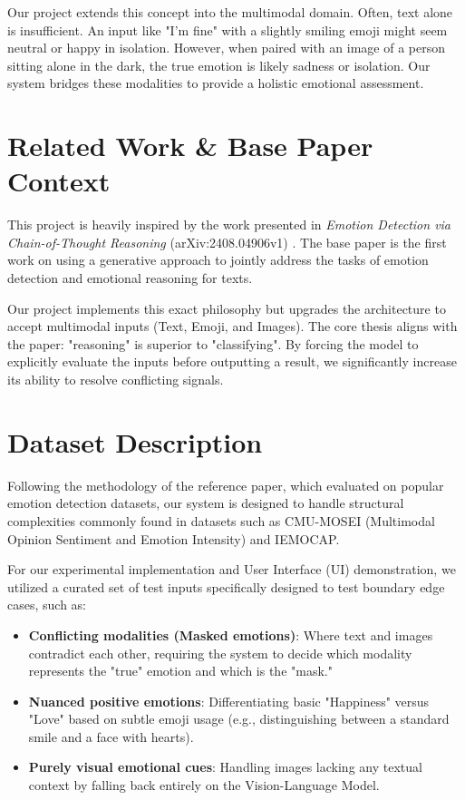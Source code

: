 \documentclass[11pt, conference, a4paper]{IEEEtran}
\begin{document}
Our project extends this concept into the multimodal domain. Often, text alone is insufficient. An input like "I'm fine" with a slightly smiling emoji might seem neutral or happy in isolation. However, when paired with an image of a person sitting alone in the dark, the true emotion is likely sadness or isolation. Our system bridges these modalities to provide a holistic emotional assessment.

\section{Related Work \& Base Paper Context}
This project is heavily inspired by the work presented in \textit{Emotion Detection via Chain-of-Thought Reasoning} (arXiv:2408.04906v1) \cite{base_paper}. The base paper is the first work on using a generative approach to jointly address the tasks of emotion detection and emotional reasoning for texts. 

Our project implements this exact philosophy but upgrades the architecture to accept multimodal inputs (Text, Emoji, and Images). The core thesis aligns with the paper: "reasoning" is superior to "classifying". By forcing the model to explicitly evaluate the inputs before outputting a result, we significantly increase its ability to resolve conflicting signals.

\section{Dataset Description}
Following the methodology of the reference paper, which evaluated on popular emotion detection datasets, our system is designed to handle structural complexities commonly found in datasets such as CMU-MOSEI (Multimodal Opinion Sentiment and Emotion Intensity) and IEMOCAP.

For our experimental implementation and User Interface (UI) demonstration, we utilized a curated set of test inputs specifically designed to test boundary edge cases, such as:
\begin{itemize}
    \item \textbf{Conflicting modalities (Masked emotions)}: Where text and images contradict each other, requiring the system to decide which modality represents the "true" emotion and which is the "mask."
    \item \textbf{Nuanced positive emotions}: Differentiating basic "Happiness" versus "Love" based on subtle emoji usage (e.g., distinguishing between a standard smile and a face with hearts).
    \item \textbf{Purely visual emotional cues}: Handling images lacking any textual context by falling back entirely on the Vision-Language Model.
\end{itemize}
\end{document}
